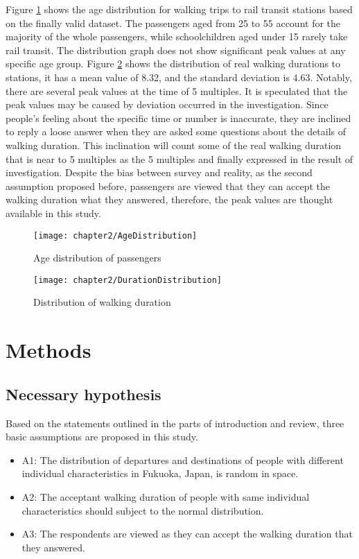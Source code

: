 %
Figure \ref{fig:chp2:AgeDistribution} shows the age distribution for walking trips to rail transit stations based on the finally valid dataset. The passengers aged from 25 to 55 account for the majority of the whole passengers, while schoolchildren aged under 15 rarely take rail transit. The distribution graph does not show significant peak values at any specific age group. Figure \ref{fig:chp2:DurationDistribution} shows the distribution of real walking durations to stations, it has a mean value of 8.32, and the standard deviation is 4.63. Notably, there are several peak values at the time of 5 multiples. It is speculated that the peak values may be caused by deviation occurred in the investigation. Since people's feeling about the specific time or number is inaccurate, they are inclined to reply a loose answer when they are asked some questions about the details of walking duration. This inclination will count some of the real walking duration that is near to 5 multiples as the 5 multiples and finally expressed in the result of investigation. Despite the bias between survey and reality, as the second assumption proposed before, passengers are viewed that they can accept the walking duration what they answered, therefore, the peak values are thought available in this study.

\begin{figure}[htbp]
	\centering
	\texttt{[image: chapter2/AgeDistribution]}
	\caption{Age distribution of passengers}
	\label{fig:chp2:AgeDistribution}
\end{figure}

\begin{figure}[htbp]
	\centering
	\texttt{[image: chapter2/DurationDistribution]}
	\caption{Distribution of walking duration}
	\label{fig:chp2:DurationDistribution}
\end{figure}

%
\section{Methods}
%
\subsection{Necessary hypothesis}
Based on the statements outlined in the parts of introduction and review, three basic assumptions are proposed in this study.

\begin{itemize}
	\setlength{\parskip}{0\baselineskip} %
	\item A1: The distribution of departures and destinations of people with different individual characteristics in Fukuoka, Japan, is random in space. 
	\item A2: The acceptant walking duration of people with same individual characteristics should subject to the normal distribution. 
	\item A3: The respondents are viewed as they can accept the walking duration that they answered.
	\setlength{\parskip}{0.7\baselineskip} %
\end{itemize}


